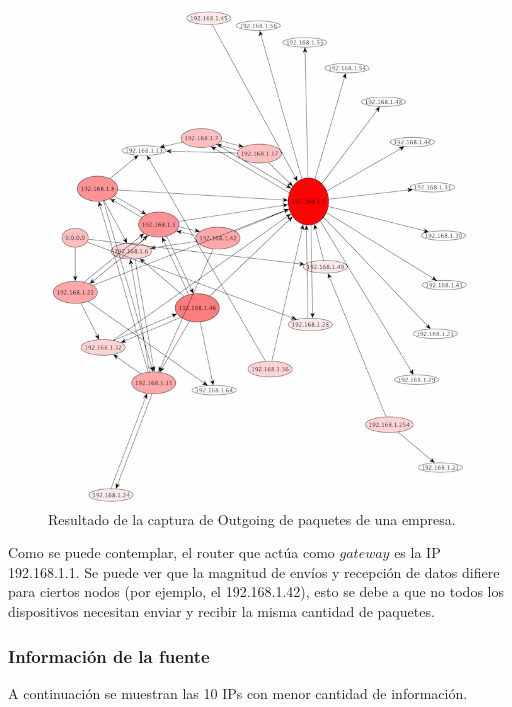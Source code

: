 \documentclass[10pt, a4paper]{article}
\begin{document}
\begin{figure}[H] %
\begin{center}
\includegraphics[width=400pt]{../imgs/tiarg-outgoing.png}
\caption{Resultado de la captura de Outgoing de paquetes de una empresa.}
\end{center}
\end{figure}

Como se puede contemplar, el router que actúa como $gateway$ es la IP 192.168.1.1. Se puede ver que la magnitud de envíos y recepción de datos difiere para ciertos nodos (por ejemplo, el 192.168.1.42), esto se debe a que no todos los dispositivos necesitan enviar y recibir la misma cantidad de paquetes.

\subsubsection{Información de la fuente}

A continuación se muestran las 10 IPs con menor cantidad de información.
\end{document}
